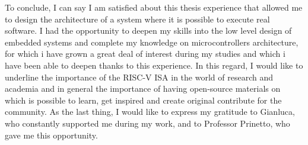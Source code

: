 To conclude, I can say I am satisfied about this thesis experience that allowed me to design the architecture of a system where it is possible to execute real software. I had the opportunity to deepen my skills into the low level design of embedded systems and complete my knowledge on microcontrollers architecture, for which i have grown a great deal of interest during my studies and which i have been able to deepen thanks to this experience. In this regard, I would like to underline the importance of the RISC-V ISA in the world of research and academia and in general the importance of having open-source materials on which is possible to learn, get inspired and create original contribute for the community. As the last thing, I would like to express my gratitude to Gianluca, who constantly supported me during my work, and to Professor Prinetto, who gave me this opportunity.

